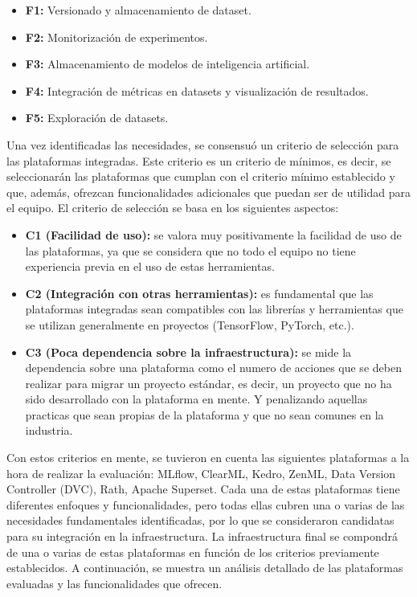 \begin{itemize}
    \item \textbf{F1:} Versionado y almacenamiento de dataset.
    \item \textbf{F2:} Monitorización de experimentos.
    \item \textbf{F3:} Almacenamiento de modelos de inteligencia artificial.
    \item \textbf{F4:} Integración de métricas en datasets y visualización de resultados.
    \item \textbf{F5:} Exploración de datasets.
\end{itemize}

Una vez identificadas las necesidades, se consensuó un criterio de selección
para las plataformas integradas. Este criterio es un criterio de mínimos, es
decir, se seleccionarán las plataformas que cumplan con el criterio mínimo
establecido y que, además, ofrezcan funcionalidades adicionales que puedan
ser de utilidad para el equipo. El criterio de selección se basa en los
siguientes aspectos: 

\begin{itemize}
    \item \textbf{C1 (Facilidad de uso):} se valora muy positivamente la facilidad de uso de las
    plataformas, ya que se considera que no todo el equipo no tiene experiencia
    previa en el uso de estas herramientas.
    \item \textbf{C2 (Integración con otras herramientas):} es fundamental que las
    plataformas integradas sean compatibles con las librerías y herramientas
    que se utilizan generalmente en proyectos (TensorFlow, PyTorch, etc.).
    \item \textbf{C3 (Poca dependencia sobre la infraestructura):} se mide la dependencia
    sobre una plataforma como el numero de acciones que se deben realizar para
    migrar un proyecto estándar, es decir, un proyecto que no ha sido
    desarrollado con la plataforma en mente. Y penalizando aquellas practicas
    que sean propias de la plataforma y que no sean comunes en la industria.
\end{itemize}

Con estos criterios en mente, se tuvieron en cuenta las siguientes
plataformas a la hora de realizar la evaluación: MLflow, ClearML, Kedro, ZenML, Data Version Controller (DVC),
Rath, Apache Superset. Cada una de estas plataformas tiene diferentes enfoques y 
funcionalidades, pero todas ellas cubren una o varias de las necesidades fundamentales
identificadas, por lo que se consideraron candidatas para su integración en la
infraestructura. La infraestructura final se compondrá de una o varias de estas
plataformas en función de los criterios previamente establecidos. A continuación, se 
muestra un análisis detallado de las plataformas evaluadas y las funcionalidades que ofrecen.\medskip

